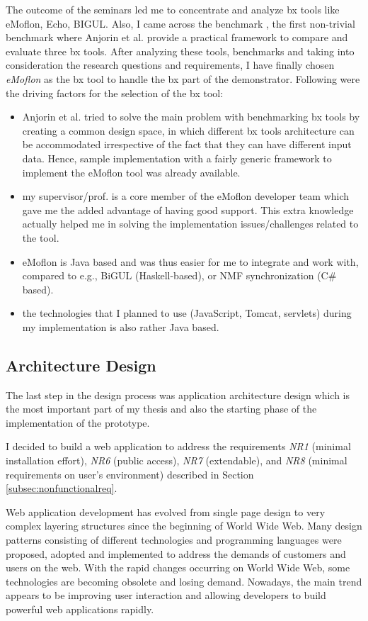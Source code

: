 The outcome of the seminars led me to concentrate and analyze bx tools like eMoflon, Echo, BIGUL. Also, I came across the benchmark \cite{benchmarx} \cite{benchmarx-reload}, the first non-trivial benchmark where Anjorin et al. provide a practical framework to compare and evaluate three bx tools. After analyzing these tools, benchmarks and taking into consideration the research questions and requirements, I have finally chosen \textit{eMoflon} as the bx tool to handle the bx part of the demonstrator. Following were the driving factors for the selection of the bx tool:
\begin{itemize}
	\item {Anjorin et al. \cite{benchmarx-reload} tried to solve the main problem with benchmarking bx tools by creating a common design space, in which different bx tools architecture can be accommodated irrespective of the fact that they can have different input data. Hence, sample implementation with a fairly generic framework to implement the eMoflon tool was already available.}
	\item {my supervisor/prof. is a core member of the eMoflon developer team which gave me the added advantage of having good support. This extra knowledge actually helped me in solving the implementation issues/challenges related to the tool.}
	\item {eMoflon is Java based and was thus easier for me to integrate and work with, compared to e.g., BiGUL (Haskell-based), or NMF synchronization (C\# based).}
	\item {the technologies that I planned to use (JavaScript, Tomcat, servlets) during my implementation is also rather Java based.}
\end{itemize}

\subsection{Architecture Design}\label{subsec:architecturedesign}
The last step in the design process was application architecture design which is the most important part of my thesis and also the starting phase of the implementation of the prototype.

I decided to build a web application to address the requirements \textit{NR1} (minimal installation effort), \textit{NR6} (public access), \textit{NR7} (extendable), and \textit{NR8} (minimal requirements on user's environment) described in Section \ref{subsec:nonfunctionalreq}.

Web application development has evolved from single page design to very complex layering structures since the beginning of World Wide Web. Many design patterns \cite{designpattern} \cite{designpattern-notes} consisting of different technologies and programming languages were proposed, adopted and implemented to address the demands of customers and users on the web. With the rapid changes occurring on World Wide Web, some technologies are becoming obsolete and losing demand. Nowadays, the main trend appears to be improving user interaction and allowing developers to build powerful web applications rapidly.

